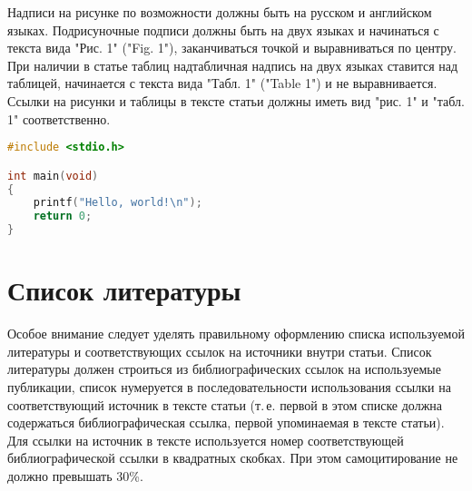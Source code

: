 \documentclass{ProcISPRAS}
\begin{document}
Надписи на рисунке по возможности должны быть на русском и английском языках.
Подрисуночные подписи должны быть на двух языках и начинаться с текста вида
"Рис. 1" ("Fig. 1"), заканчиваться точкой и выравниваться по центру. При наличии
в статье таблиц надтабличная надпись на двух языках ставится над таблицей,
начинается с текста вида "Табл. 1" ("Table 1")  и не выравнивается. Ссылки на
рисунки и таблицы в тексте статьи должны иметь вид "рис. 1" и "табл. 1"
соответственно.

\begin{listing}[t]
\begin{lstlisting}[language=C,frame=none,basicstyle=\ttfamily]
#include <stdio.h>

int main(void)
{
    printf("Hello, world!\n");
    return 0;
}
\end{lstlisting}
\centering
{}
\label{lst:my_label}
\end{listing}

\begin{algorithm}[t]
\begin{algorithmic}
      \State {}
      \State {}
    \EndWhile
  \EndFor
\EndProcedure
\end{algorithmic}
\label{alg:my_label}
\end{algorithm}

\section{Список литературы}

Особое внимание следует уделять правильному оформлению списка используемой
литературы и соответствующих ссылок на источники внутри статьи. Список
литературы должен строиться из библиографических ссылок на используемые
публикации, список нумеруется в последовательности использования ссылки на
соответствующий источник в тексте статьи (т.\,е. первой в этом списке должна
содержаться библиографическая  ссылка, первой упоминаемая в тексте статьи). Для
ссылки на источник в тексте используется номер соответствующей библиографической
ссылки в квадратных скобках. При этом самоцитирование не должно превышать 30\%.
\end{document}
